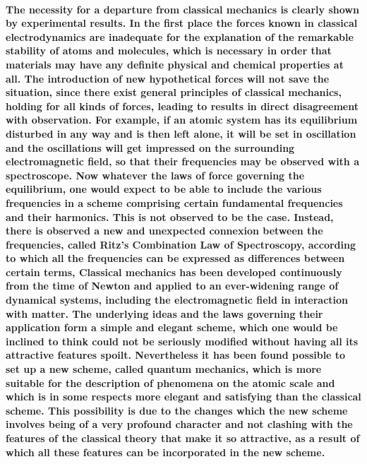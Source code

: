 \documentclass[10pt, kindle, oneside]{kindle}
\begin{document}
\paragraph{The necessity for a departure from classical mechanics is clearly shown by experimental results. In the first place the forces known in classical electrodynamics are inadequate for the explanation of the remarkable stability of atoms and molecules, which is necessary in order that materials may have any definite physical and chemical properties at all. The introduction of new hypothetical forces will not save the situation, since there exist general principles of classical mechanics, holding for all kinds of forces, leading to results in direct disagreement with observation. For example, if an atomic system has its equilibrium disturbed in any way and is then left alone, it will be set in oscillation and the oscillations will get impressed on the surrounding electromagnetic field, so that their frequencies may be observed with a spectroscope. Now whatever the laws of force governing the equilibrium, one would expect to be able to include the various frequencies in a scheme comprising certain fundamental frequencies and their harmonics. This is not observed to be the case. Instead, there is observed a new and unexpected connexion between the frequencies, called Ritz's Combination Law of Spectroscopy, according to which all the frequencies can be expressed as differences between certain terms, Classical mechanics has been developed continuously from the time of Newton and applied to an ever-widening range of dynamical systems, including the electromagnetic field in interaction with matter. The underlying ideas and the laws governing their application form a simple and elegant scheme, which one would be inclined to think could not be seriously modified without having all its attractive features spoilt. Nevertheless it has been found possible to set up a new scheme, called quantum mechanics, which is more suitable for the description of phenomena on the atomic scale and which is in some respects more elegant and satisfying than the classical scheme. This possibility is due to the changes which the new scheme involves being of a very profound character and not clashing with the features of the classical theory that make it so attractive, as a result of which all these features can be incorporated in the new scheme.}
\end{document}

